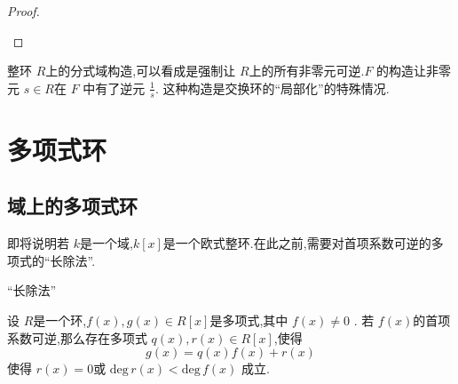 \documentclass[lang=cn,12pt,color=green,fontset=none,pad]{elegantbook}
\begin{document}
\begin{proof}
\begin{enumerate}
    \end{enumerate}
    
\end{proof}

\begin{conclusion}
    整环 $ R $上的分式域构造,可以看成是强制让 $ R $上的所有非零元可逆.$ F $ 的构造让非零元 $ s \in R $在 $ F $ 中有了逆元 $ \frac{1}{s} $.   
    这种构造是交换环的“局部化”的特殊情况. 
\end{conclusion}




\chapter{多项式环}

\section{域上的多项式环}

即将说明若 $ k $是一个域,$ k\left[ x \right]  $是一个欧式整环.在此之前,需要对首项系数可逆的多项式的“长除法”.



\begin{lemma}{“长除法”}\label{lem:long-division}

    设 $ R $是一个环,$  f\left( x \right),g\left( x \right) \in R[x]   $是多项式,其中 $ f\left( x \right) \neq  0  $   .
    若 $ f\left( x \right)  $的首项系数可逆,那么存在多项式 $ q\left( x \right),r\left( x \right) \in R\left[ x \right]    $,使得 $$
    g\left( x \right)= q\left( x \right)f\left( x \right)+ r\left( x \right)    
    $$使得 $ r\left( x \right)=0  $或 $ \mathrm{deg}\,r\left( x \right)     < \mathrm{deg}\,f\left( x \right)  $  成立.
\end{lemma}
\end{document}
